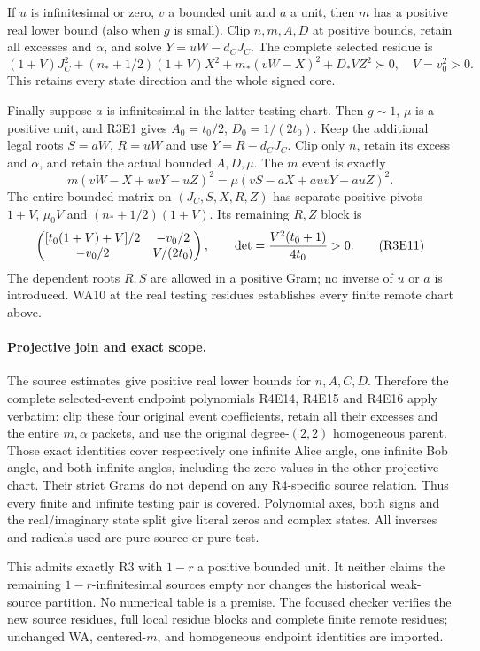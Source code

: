If $u$ is infinitesimal or zero, $v$ a bounded unit and $a$ a unit,
then $m$ has a positive real lower bound (also when $g$ is small).
Clip $n,m,A,D$ at positive bounds, retain all excesses and $\alpha$,
and solve $Y=uW-d_CJ_C$. The complete selected residue is
\[
 (1+V)J_C^2+(n_*+1/2)(1+V)X^2
       +m_*(vW-X)^2+D_*VZ^2\succ0,\quad V=v_0^2>0.              \tag{R3E9}
\]
This retains every state direction and the whole signed core.

Finally suppose $a$ is infinitesimal in the latter testing chart.
Then $g\sim1$, $\mu$ is a positive unit, and R3E1 gives
$A_0=t_0/2$, $D_0=1/(2t_0)$. Keep the additional legal roots
$S=aW$, $R=uW$ and use $Y=R-d_CJ_C$. Clip only $n$, retain its
excess and $\alpha$, and retain the actual bounded $A,D,\mu$.
The $m$ event is exactly
\[
 m(vW-X+uvY-uZ)^2
       =\mu(vS-aX+auvY-auZ)^2.                    \tag{R3E10}
\]
The entire bounded matrix on $(J_C,S,X,R,Z)$ has separate
positive pivots $1+V$, $\mu_0V$ and $(n_*+1/2)(1+V)$.
Its remaining $R,Z$ block is
\[
 \begin{pmatrix}
 [t_0(1+V)+V]/2&-v_0/2\\
 -v_0/2&V/(2t_0)
 \end{pmatrix},\qquad
 \det={V^2(t_0+1)\over4t_0}>0.                    \tag{R3E11}
\]
The dependent roots $R,S$ are allowed in a positive Gram; no inverse
of $u$ or $a$ is introduced. WA10 at the real testing residues
establishes every finite remote chart above.

\paragraph{Projective join and exact scope.}
The source estimates give positive real lower bounds for $n,A,C,D$.
Therefore the complete selected-event endpoint polynomials R4E14,
R4E15 and R4E16 apply verbatim: clip these four original event
coefficients, retain all their excesses and the entire $m,\alpha$
packets, and use the original degree-$(2,2)$ homogeneous parent.
Those exact identities cover respectively one infinite Alice angle,
one infinite Bob angle, and both infinite angles, including the
zero values in the other projective chart. Their strict Grams do
not depend on any R4-specific source relation. Thus every finite
and infinite testing pair is covered. Polynomial axes, both signs
and the real/imaginary state split give literal zeros and complex
states. All inverses and radicals used are pure-source or pure-test.

This admits exactly R3 with $1-r$ a positive bounded unit. It neither
claims the remaining $1-r$-infinitesimal sources empty nor changes
the historical weak-source partition. No numerical table is a
premise. The focused checker verifies the new source residues, full
local residue blocks and complete finite remote residues; unchanged
WA, centered-$m$, and homogeneous endpoint identities are imported.

